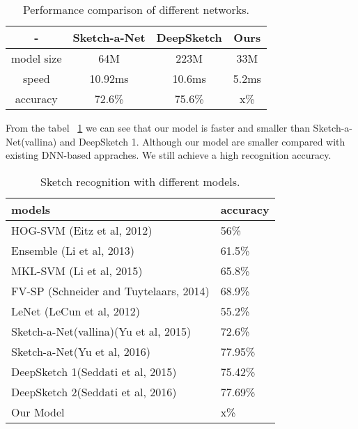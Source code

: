 \begin{table}[htbp]
\centering
\begin{tabular}{cccc}
    \hline
     -&Sketch-a-Net& DeepSketch& Ours\\
    \hline
     model size& 64M&223M& 33M\\
     speed &10.92ms&10.6ms& 5.2ms\\
     accuracy & 72.6\% & 75.6\%& x\% \\
    \hline
\end{tabular}
\caption{Performance comparison of different networks.}
\label{tbl:speed}
\end{table}
From the tabel ~\ref{tbl:speed} we can see that our model is faster and smaller than Sketch-a-Net(vallina) and DeepSketch 1. Although our model are smaller compared with existing DNN-based appraches. We still achieve a high recognition accuracy.

\begin{table}[htbp]
\centering
\begin{tabular}{ll}
    \hline
     models &accuracy\\
    \hline
     HOG-SVM (Eitz et al, 2012)& 56\%\\
     Ensemble (Li et al, 2013) &61.5\%\\
     MKL-SVM (Li et al, 2015) & 65.8\% \\
     FV-SP (Schneider and Tuytelaars, 2014) & 68.9\% \\
     LeNet (LeCun et al, 2012)& 55.2\% \\
     Sketch-a-Net(vallina)(Yu et al, 2015)& 72.6\% \\
     Sketch-a-Net(Yu et al, 2016)& 77.95\% \\
     DeepSketch 1(Seddati et al, 2015)& 75.42\% \\
     DeepSketch 2(Seddati et al, 2016)& 77.69\% \\
     Our Model& x\% \\
    \hline
\end{tabular}
\caption{Sketch recognition with different models.}
\label{tbl:acc}
\end{table}
